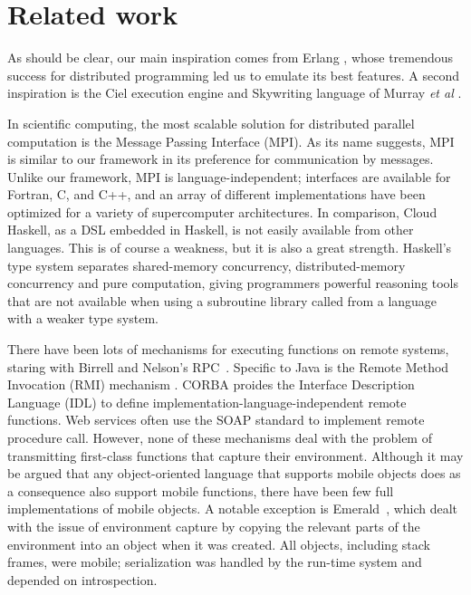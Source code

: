 \documentclass[preprint]{sigplanconf}
\begin{document}

\section{Related work} \label{s:related}

As should be clear, our main inspiration comes from Erlang \cite{Erlang93}, whose tremendous
success for distributed programming led us to emulate its best features.
A second inspiration is the Ciel execution engine and Skywriting language
of Murray \emph{et al} \cite{Murray2010, Murray2011}.

In scientific computing, the most scalable solution for distributed parallel computation is the Message Passing Interface (MPI). As its name suggests, MPI is similar to our framework in its preference for communication by messages. Unlike our framework, MPI is language-independent; interfaces are available for Fortran, C, and C++, and an array of different implementations have been optimized for a variety of supercomputer architectures.  In comparison, Cloud Haskell, as a DSL embedded in Haskell, is not easily available from other languages.
This is of course a weakness, but it is also a great strength.  
Haskell's type system separates shared-memory concurrency, distributed-memory concurrency and pure computation, giving programmers powerful reasoning tools that are not available when using a subroutine library called from a language with a weaker type system. 

There have been lots of mechanisms for executing functions on remote
systems, staring with Birrell and Nelson's RPC~\cite{birrel1984}.
Specific to Java is the Remote Method Invocation (RMI) mechanism
\cite{javarmi}. CORBA proides the Interface Description Language (IDL)
\cite{corbaidl} to define implementation-language-independent remote
functions. Web services often use the SOAP standard to implement
remote procedure call.  However, none of these mechanisms deal with the problem of transmitting first-class functions that capture their environment.
Although it may be argued that any object-oriented language that supports mobile objects does as a consequence also support mobile functions, there have been few full implementations of mobile objects.  A notable exception is Emerald~\cite{jul1988}, which dealt with the issue of environment capture  by copying the relevant parts of the environment into an object when it was created.  
All objects, including stack frames, were mobile; serialization was handled by the run-time system and depended on introspection.
\end{document}
